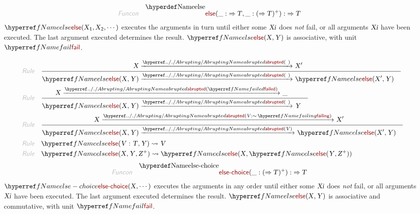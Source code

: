 \begin{align*}
  \KEY{Funcon} \quad
  & \NAMEDECL{else}(
                       \_ :  \TO \VAR{T}, \_ : (   \TO \VAR{T} )\PLUS) 
    :  \TO \VAR{T} 
\end{align*}
$\SHADE{\NAMEREF{else}
           (  \VAR{X}\SUB{1}, 
                  \VAR{X}\SUB{2}, 
                  \cdots )}$ executes the arguments in turn until either some
  $\SHADE{\VAR{Xi}}$ does \emph{not} fail, or all arguments $\SHADE{\VAR{Xi}}$ have been executed.
  The last argument executed determines the result.
  $\SHADE{\NAMEREF{else}
           (  \VAR{X}, 
                  \VAR{Y} )}$ is associative, with unit $\SHADE{\NAMEREF{fail}}$.

\begin{align*}
  \KEY{Rule} \quad
    & \RULE{
      &  \VAR{X} \xrightarrow{\NAMEHYPER{../.}{Abrupting}{abrupted}(   \  )}_{} 
          \VAR{X}'
      }{
      &  \NAMEREF{else}
                      (  \VAR{X}, 
                             \VAR{Y} ) \xrightarrow{\NAMEHYPER{../.}{Abrupting}{abrupted}(   \  )}_{} 
          \NAMEREF{else}
            (  \VAR{X}', 
                   \VAR{Y} )
      }
\\
  \KEY{Rule} \quad
    & \RULE{
      &  \VAR{X} \xrightarrow{\NAMEHYPER{../.}{Abrupting}{abrupted}(  \NAMEREF{failed} )}_{} 
          \_
      }{
      &  \NAMEREF{else}
                      (  \VAR{X}, 
                             \VAR{Y} ) \xrightarrow{\NAMEHYPER{../.}{Abrupting}{abrupted}(   \  )}_{} 
          \VAR{Y}
      }
\\
  \KEY{Rule} \quad
    & \RULE{
      &  \VAR{X} \xrightarrow{\NAMEHYPER{../.}{Abrupting}{abrupted}(  \VAR{V} : \mathop{\sim} \NAMEREF{failing} )}_{} 
          \VAR{X}'
      }{
      &  \NAMEREF{else}
                      (  \VAR{X}, 
                             \VAR{Y} ) \xrightarrow{\NAMEHYPER{../.}{Abrupting}{abrupted}(  \VAR{V} )}_{} 
          \NAMEREF{else}
            (  \VAR{X}', 
                   \VAR{Y} )
      }
\\
  \KEY{Rule} \quad
    & \NAMEREF{else}
        (  \VAR{V} : \VAR{T}, 
               \VAR{Y} ) \leadsto 
        \VAR{V}
\\
  \KEY{Rule} \quad
    & \NAMEREF{else}
        (  \VAR{X}, 
               \VAR{Y}, 
               \VAR{Z}\PLUS ) \leadsto 
        \NAMEREF{else}
          (  \VAR{X}, 
                 \NAMEREF{else}
                  (  \VAR{Y}, 
                         \VAR{Z}\PLUS ) )
\end{align*}
\begin{align*}
  \KEY{Funcon} \quad
  & \NAMEDECL{else-choice}(
                       \_ : (   \TO \VAR{T} )\PLUS) 
    :  \TO \VAR{T} 
\end{align*}
$\SHADE{\NAMEREF{else-choice}
           (  \VAR{X}, 
                  \cdots )}$ executes the arguments in any order until either some
  $\SHADE{\VAR{Xi}}$ does \emph{not} fail, or all arguments $\SHADE{\VAR{Xi}}$ have been executed.
  The last argument executed determines the result.
  $\SHADE{\NAMEREF{else}
           (  \VAR{X}, 
                  \VAR{Y} )}$ is associative and commutative, with unit $\SHADE{\NAMEREF{fail}}$.

